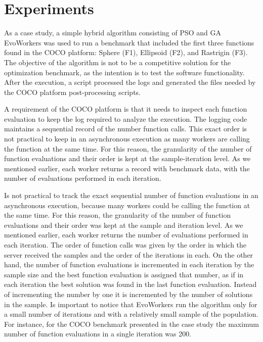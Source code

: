 \section{Experiments}
 \label{sec:experiments}
As a case study, a simple hybrid algorithm consisting 
of PSO and GA EvoWorkers was used to run a benchmark that 
included the first three functions found in the COCO platform:  
Sphere (F1), Ellipsoid (F2), and Rastrigin (F3). The objective 
of the algorithm is not to be a competitive solution for 
the optimization benchmark, as the intention is to test 
the software functionality. After the 
execution, a script processed the logs and generated the files 
needed by the COCO platform post-processing scripts. 

A requirement of the COCO platform is that it needs 
to inspect each function evaluation to keep the log required 
to analyze the execution. The logging code maintains 
a sequential record of the number function calls. 
This exact order is not practical to keep in an asynchronous 
execution as many workers are calling the function at the 
same time. For this reason, the granularity of the number of 
function evaluations and their order is kept at the 
sample-iteration level. As we mentioned earlier, each worker 
returns a record with benchmark data, with the number of 
evaluations performed in each iteration.

Is not practical to track the exact sequential 
number of function evaluations in an asynchronous 
execution, because many workers could be calling 
the function at the same time. For this reason, the 
granularity of the number of function evaluations and 
their order was kept at the sample and iteration level. 
As we mentioned earlier, each worker returns the number 
of evaluations performed in each iteration. The order 
of function calls was given by the order in which the 
server received the samples and the order of the 
iterations in each. On the other hand, the number of 
function evaluations is incremented in each iteration 
by the sample size and the best function evaluation is 
assigned that number,  as if in each iteration the best 
solution was found in the last function evaluation. Instead 
of incrementing the number by one it is incremented by the 
number of solutions in the sample. 
Is important to notice that EvoWorkers run the algorithm 
only for a small number of iterations and with 
a relatively small sample of the population. For instance,
for the COCO benchmark presented in the case study the maximum number of 
function evaluations in a single iteration was 200. 
  

